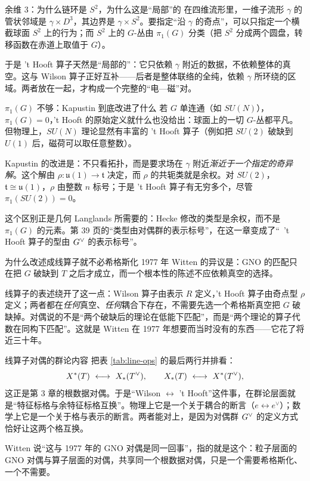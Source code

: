 \begin{pizhu}{余维 $3$：为什么链环是 $S^2$，为什么这是“局部”的}
在四维流形里，一维子流形 $\gamma$ 的管状邻域是 $\gamma\times D^3$，其边界是 $\gamma\times S^2$。要指定“沿 $\gamma$ 的奇点”，可以只指定一个横截球面 $S^2$ 上的行为；而 $S^2$ 上的 $G$-丛由 $\pi_1(G)$ 分类（把 $S^2$ 分成两个圆盘，转移函数在赤道上取值于 $G$）。

于是 't Hooft 算子天然是“局部的”：它只依赖 $\gamma$ 附近的数据，不依赖整体的真空。这与 Wilson 算子正好互补——后者是整体联络的全纯，依赖 $\gamma$ 所环绕的区域。两者放在一起，才构成一个完整的“电—磁”对。
\end{pizhu}

\begin{pizhu}{$\pi_1(G)$ 不够：Kapustin 到底改进了什么}
若 $G$ 单连通（如 $SU(N)$），$\pi_1(G)=0$，'t Hooft 的原始定义就什么也没给出：球面上的一切 $G$-丛都平凡。但物理上，$SU(N)$ 理论显然有丰富的 't Hooft 算子（例如把 $SU(2)$ 破缺到 $U(1)$ 后，磁荷可以取任意整数）。

Kapustin 的改进是：不只看拓扑，而是要求场在 $\gamma$ 附近\emph{渐近于一个指定的奇异解}。这个解由 $\rho:\mathfrak u(1)\to\mathfrak t$ 决定，而 $\rho$ 的共轭类就是余权。对 $SU(2)$，$\mathfrak t\cong\mathfrak u(1)$，$\rho$ 由整数 $n$ 标号；于是 't Hooft 算子有无穷多个，尽管 $\pi_1(SU(2))=0$。

这个区别正是几何 Langlands 所需要的：Hecke 修改的类型是余权，而不是 $\pi_1(G)$ 的元素。第 39 页的“类型由对偶群的表示标号”，在这一章变成了“\ 't Hooft 算子的型由 $G^{\vee}$ 的表示标号”。
\end{pizhu}

\begin{pizhu}{为什么改述成线算子就不必希格斯化}
1977 年 Witten 的异议是：GNO 的匹配只在把 $G$ 破缺到 $T$ 之后才成立，而一个根本性的陈述不应依赖真空的选择。

线算子的表述绕开了这一点：Wilson 算子由表示 $R$ 定义，'t Hooft 算子由奇点型 $\rho$ 定义；两者都在\emph{任何}真空、\emph{任何}耦合下存在，不需要先选一个希格斯真空把 $G$ 破缺掉。对偶说的不是“两个破缺后的理论在低能下匹配”，而是“两个理论的算子代数在同构下匹配”。这就是 Witten 在 1977 年想要而当时没有的东西——它花了将近三十年。
\end{pizhu}

\begin{pizhu}{线算子对偶的群论内容}
把表 \ref{tab:line-ops} 的最后两行并排看：
\[
  X^*(T)\ \longleftrightarrow\ X_*(\Tvee),\qquad
  X_*(T)\ \longleftrightarrow\ X^*(\Tvee),
\]
这正是第 3 章的根数据对偶。于是“Wilson $\leftrightarrow$ 't Hooft”这件事，在群论层面就是“特征标格与余特征标格互换”。物理上它是一个关于耦合的断言（$e\leftrightarrow e^\vee$）；数学上它是一个关于格与表示的断言。两者能对上，是因为对偶群 $G^{\vee}$ 的定义方式恰好让这两个格互换。

Witten 说“这与 1977 年的 GNO 对偶是同一回事”，指的就是这个：粒子层面的 GNO 对偶与算子层面的对偶，共享同一个根数据对偶，只是一个需要希格斯化、一个不需要。
\end{pizhu}
